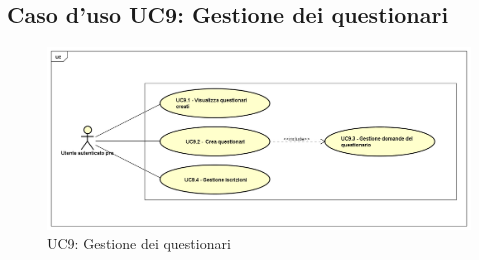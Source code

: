 \subsection{Caso d'uso UC9: Gestione dei questionari}
\label{UC9}
\begin{figure}[h]
	\centering
	\includegraphics[scale=0.5,keepaspectratio]{UML/UC9.png}
	\caption{UC9: Gestione dei questionari}
\end{figure}
\FloatBarrier
